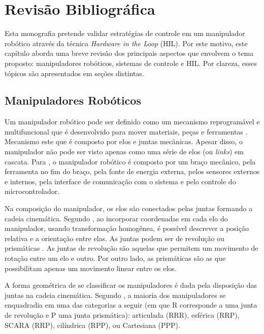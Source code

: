 \chapter{Revisão Bibliográfica}

Esta monografia pretende validar estratégias de controle em um manipulador robótico 
através da técnica \textit{Hardware in the Loop} (HIL). Por este motivo, este capítulo 
aborda uma breve revisão dos principais aspectos que envolvem o tema proposto: manipuladores 
robóticos, sistemas de controle e HIL. Por clareza, esses tópicos são apresentados em seções 
distintas.


\section{Manipuladores Robóticos}

Um manipulador robótico pode ser definido como um mecanismo reprogramável e multifuncional
que é desenvolvido para mover materiais, peças e ferramentas \cite{Murphy:2000:IAR:517685}. 
Mecanismo este que é composto por elos e juntas mecânicas. Apesar disso, o manipulador não pode ser 
visto apenas como uma série de elos (ou \textit{links}) em cascata. Para , 
o manipulador robótico é composto por um braço mecânico, pela ferramenta no fim do braço, 
pela fonte de energia externa, pelos sensores externos e internos, pela interface de comunicação
com o sistema e pelo controle do microcontrolador.

Na composição do manipulador, os elos são conectados pelas juntas formando a cadeia 
cinemática. Segundo , ao incorporar coordenadas em cada elo do manipulador, 
usando transformação homogênea, é possível descrever a posição relativa e a orientação entre elas. 
As juntas podem ser de revolução ou prismáticas \cite{paul1981robot}. As juntas de revolução
são aquelas que permitem um movimento de rotação entre um elo e outro. Por outro lado,
as prismáticas são as que possibilitam apenas um movimento linear entre os elos.

A forma geométrica de se classificar os manipuladores é dada pela disposição das juntas 
na cadeia cinemática. Segundo , a maioria dos manipuladores se 
enquadradia em uma das categorias a seguir (em que R corresponde a uma junta de revolução 
e P uma junta prismática): articulada (RRR), esférica (RRP), SCARA (RRP), cilíndrica 
(RPP), ou Cartesiana (PPP).


